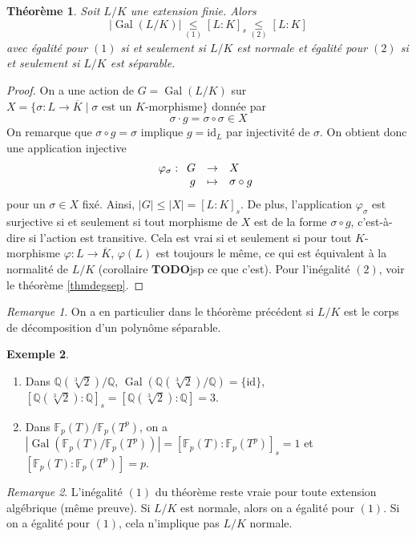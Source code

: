 \documentclass{article}
\newcommand{\id}{\mathrm{id}}
\newcommand{\Q}{\mathbb{Q}}
\newcommand{\F}{\mathbb{F}}
\DeclareMathOperator{\Gal}{Gal}
\newcommand{\todo}{\textbf{TODO}}
\newcommand{\applic}[4]{\begin{array}[t]{rcl}
#1 & \to & #2 \\
#3 & \mapsto & #4
\end{array}}
\theoremstyle{plain}
\newtheorem{theorem}{Théorème}[subsection]
\theoremstyle{definition}
\newtheorem{example}[theorem]{Exemple}
\theoremstyle{remark}
\newtheorem*{remark}{Remarque}
\begin{document}
\begin{theorem} \label{thmgaloisdeg}
    Soit $L/K$ une extension finie. Alors
    \[|\Gal(L/K)| \underset{(1)}{\le} [L : K]_s \underset{(2)}{\le} [L : K]\]
    avec égalité pour $(1)$ si et seulement si $L/K$ est normale et égalité pour $(2)$ si et seulement si $L/K$ est séparable.
\end{theorem}

\begin{proof}
    On a une action de $G = \Gal(L/K)$ sur $X = \{\sigma : L \to \overline{K} \mid \sigma \text{ est un $K$-morphisme}\}$ donnée par
    \[\sigma \cdot g = \sigma \circ \sigma \in X\]
    On remarque que $\sigma \circ g = \sigma$ implique $g = \id_L$ par injectivité de $\sigma$. On obtient donc une application injective
    \[\varphi_\sigma : \applic{G}{X}{g}{\sigma \circ g}\]
    pour un $\sigma \in X$ fixé. Ainsi, $|G| \le |X| = [L : K]_s$. De plus, l'application $\varphi_\sigma$ est surjective si et seulement si tout morphisme de $X$ est de la forme $\sigma \circ g$, c'est-à-dire si l'action est transitive. Cela est vrai si et seulement si pour tout $K$-morphisme $\varphi : L \to \overline{K}$, $\varphi(L)$ est toujours le même, ce qui est équivalent à la normalité de $L/K$ (corollaire \todo jsp ce que c'est). Pour l'inégalité $(2)$, voir le théorème \ref{thmdegsep}.
\end{proof}

\begin{remark}
    On a en particulier dans le théorème précédent si $L/K$ est \og le \fg corps de décomposition d'un polynôme séparable.
\end{remark}

\begin{example} \leavevmode
    \begin{enumerate}
        \item Dans $\Q(\sqrt[3]{2})/\Q$, $\Gal(\Q(\sqrt[3]{2})/\Q) = \{\id\}$, $[\Q(\sqrt[3]{2}) : \Q]_s = [\Q(\sqrt[3]{2}) : \Q] = 3$.
        \item Dans $\F_p(T)/\F_p(T^p)$, on a $|\Gal(\F_p(T)/\F_p(T^p))| = [\F_p(T) : \F_p(T^p)]_s = 1$ et $[\F_p(T) : \F_p(T^p)] = p$.
    \end{enumerate}
\end{example}

\begin{remark}
    L'inégalité $(1)$ du théorème reste vraie pour toute extension algébrique (même preuve). Si $L/K$ est normale, alors on a égalité pour $(1)$. Si on a égalité pour $(1)$, cela n'implique pas $L/K$ normale.
\end{remark}
\end{document}
